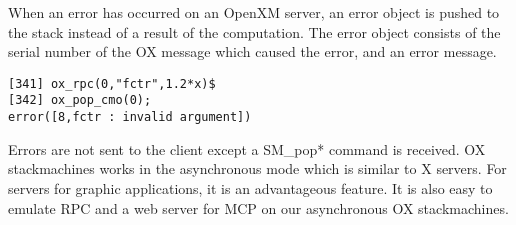 When an error has occurred on an OpenXM server,
an error object is pushed to the stack instead of a result of the computation.
The error object consists of the serial number of the OX message
which caused the error, and an error message.
\begin{verbatim}
[341] ox_rpc(0,"fctr",1.2*x)$
[342] ox_pop_cmo(0);
error([8,fctr : invalid argument])
\end{verbatim}

Errors are not sent to the client except a SM\_pop* command is received.
OX stackmachines works in the asynchronous mode which is similar 
to X servers.
For servers for graphic applications, it is an advantageous feature.
It is also easy to emulate RPC and a web server for MCP \cite{iamc} 
on our asynchronous OX stackmachines.





